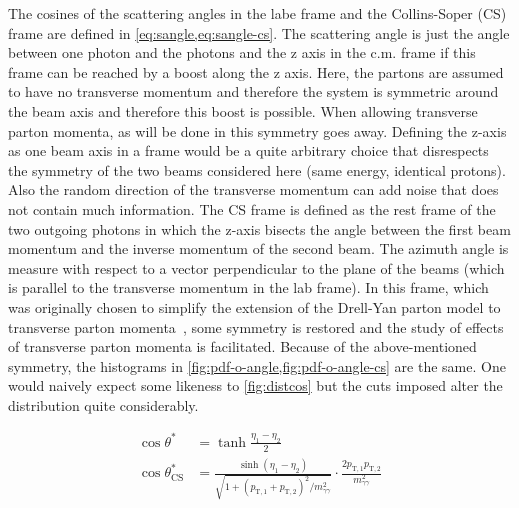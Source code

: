 The cosines of the scattering angles in the labe frame and the
Collins-Soper (CS) frame are defined in
\cref{eq:sangle,eq:sangle-cs}. The scattering angle is just the angle
between one photon and the photons and the z axis in the c.m. frame if
this frame can be reached by a boost along the z axis. Here, the
partons are assumed to have no transverse momentum and therefore the
system is symmetric around the beam axis and therefore this boost is
possible. When allowing transverse parton momenta, as will be done
in %
this symmetry goes away. Defining the z-axis as one beam axis in a
frame would be a quite arbitrary choice that disrespects the symmetry
of the two beams considered here (same energy, identical protons).
Also the random direction of the transverse momentum can add noise
that does not contain much information. The CS frame is defined as the
rest frame of the two outgoing photons in which the z-axis bisects the
angle between the first beam momentum and the inverse momentum of the
second beam. The azimuth angle is measure with respect to a vector
perpendicular to the plane of the beams (which is parallel to the
transverse momentum in the lab frame). In this frame, which was
originally chosen to simplify the extension of the Drell-Yan parton
model to transverse parton momenta~\cite{collins:1977an}, some
symmetry is restored and the study of effects of transverse parton
momenta is facilitated. Because of the above-mentioned symmetry, the
histograms in \cref{fig:pdf-o-angle,fig:pdf-o-angle-cs} are the
same. One would naively expect some likeness to \cref{fig:distcos} but
the cuts imposed alter the distribution quite
considerably. %

\begin{align}
  \cos\theta^\ast &= \tanh\frac{\eta_1 - \eta_2}{2} \label{eq:sangle}\\
  \cos\theta^*_\text{CS} &= \frac{\sinh(\eta_1 -
                           \eta_2)}{\sqrt{1+(p_{\text{T},1} + p_{\text{T},2})^2/m_{\gamma\gamma}^2}}\cdot
                          \frac{2p_{\text{T},1}p_{\text{T},2}}{m_{\gamma\gamma}^2}\label{eq:sangle-cs}
\end{align}


